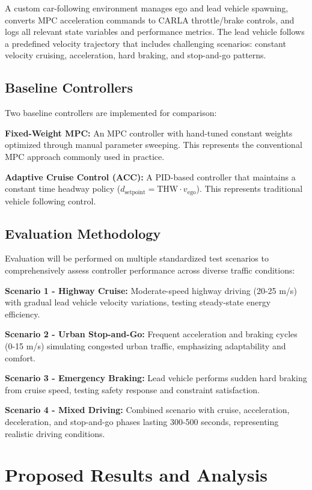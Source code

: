 \documentclass[conference,onecolumn,draftclsnofoot]{IEEEtran}
\begin{document}
A custom car-following environment manages ego and lead vehicle spawning, converts MPC acceleration commands to CARLA throttle/brake controls, and logs all relevant state variables and performance metrics. The lead vehicle follows a predefined velocity trajectory that includes challenging scenarios: constant velocity cruising, acceleration, hard braking, and stop-and-go patterns.

\subsection{Baseline Controllers}

Two baseline controllers are implemented for comparison:

\textbf{Fixed-Weight MPC:} An MPC controller with hand-tuned constant weights optimized through manual parameter sweeping. This represents the conventional MPC approach commonly used in practice.

\textbf{Adaptive Cruise Control (ACC):} A PID-based controller that maintains a constant time headway policy ($d_{\text{setpoint}} = \text{THW} \cdot v_{\text{ego}}$). This represents traditional vehicle following control.

\subsection{Evaluation Methodology}

Evaluation will be performed on multiple standardized test scenarios to comprehensively assess controller performance across diverse traffic conditions:

\textbf{Scenario 1 - Highway Cruise:} Moderate-speed highway driving (20-25 m/s) with gradual lead vehicle velocity variations, testing steady-state energy efficiency.

\textbf{Scenario 2 - Urban Stop-and-Go:} Frequent acceleration and braking cycles (0-15 m/s) simulating congested urban traffic, emphasizing adaptability and comfort.

\textbf{Scenario 3 - Emergency Braking:} Lead vehicle performs sudden hard braking from cruise speed, testing safety response and constraint satisfaction.

\textbf{Scenario 4 - Mixed Driving:} Combined scenario with cruise, acceleration, deceleration, and stop-and-go phases lasting 300-500 seconds, representing realistic driving conditions.

\section{Proposed Results and Analysis}
\end{document}
